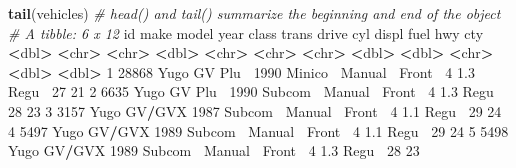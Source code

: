 \documentclass[
]{book}
\newenvironment{Shaded}{\begin{snugshade}}{\end{snugshade}}
\newcommand{\CommentTok}[1]{\textcolor[rgb]{0.56,0.35,0.01}{\textit{#1}}}
\newcommand{\DecValTok}[1]{\textcolor[rgb]{0.00,0.00,0.81}{#1}}
\newcommand{\ErrorTok}[1]{\textcolor[rgb]{0.64,0.00,0.00}{\textbf{#1}}}
\newcommand{\FloatTok}[1]{\textcolor[rgb]{0.00,0.00,0.81}{#1}}
\newcommand{\KeywordTok}[1]{\textcolor[rgb]{0.13,0.29,0.53}{\textbf{#1}}}
\newcommand{\NormalTok}[1]{#1}
\newcommand{\OperatorTok}[1]{\textcolor[rgb]{0.81,0.36,0.00}{\textbf{#1}}}
\newcommand{\StringTok}[1]{\textcolor[rgb]{0.31,0.60,0.02}{#1}}
\begin{document}
\begin{Shaded}
\begin{Highlighting}[]
\KeywordTok{tail}\NormalTok{(vehicles) }\CommentTok{# head() and tail() summarize the beginning and end of the object}
\CommentTok{# A tibble: 6 x 12}
\NormalTok{     id make  model    year class   trans   drive    cyl displ fuel    hwy   cty}
  \OperatorTok{<}\NormalTok{dbl}\OperatorTok{>}\StringTok{ }\ErrorTok{<}\NormalTok{chr}\OperatorTok{>}\StringTok{ }\ErrorTok{<}\NormalTok{chr}\OperatorTok{>}\StringTok{   }\ErrorTok{<}\NormalTok{dbl}\OperatorTok{>}\StringTok{ }\ErrorTok{<}\NormalTok{chr}\OperatorTok{>}\StringTok{   }\ErrorTok{<}\NormalTok{chr}\OperatorTok{>}\StringTok{   }\ErrorTok{<}\NormalTok{chr}\OperatorTok{>}\StringTok{  }\ErrorTok{<}\NormalTok{dbl}\OperatorTok{>}\StringTok{ }\ErrorTok{<}\NormalTok{dbl}\OperatorTok{>}\StringTok{ }\ErrorTok{<}\NormalTok{chr}\OperatorTok{>}\StringTok{ }\ErrorTok{<}\NormalTok{dbl}\OperatorTok{>}\StringTok{ }\ErrorTok{<}\NormalTok{dbl}\OperatorTok{>}
\DecValTok{1} \DecValTok{28868}\NormalTok{ Yugo  GV Plu}\OperatorTok{~}\StringTok{  }\DecValTok{1990}\NormalTok{ Minico}\OperatorTok{~}\StringTok{ }\NormalTok{Manual}\OperatorTok{~}\StringTok{ }\NormalTok{Front}\OperatorTok{~}\StringTok{     }\DecValTok{4}   \FloatTok{1.3}\NormalTok{ Regu}\OperatorTok{~}\StringTok{    }\DecValTok{27}    \DecValTok{21}
\DecValTok{2}  \DecValTok{6635}\NormalTok{ Yugo  GV Plu}\OperatorTok{~}\StringTok{  }\DecValTok{1990}\NormalTok{ Subcom}\OperatorTok{~}\StringTok{ }\NormalTok{Manual}\OperatorTok{~}\StringTok{ }\NormalTok{Front}\OperatorTok{~}\StringTok{     }\DecValTok{4}   \FloatTok{1.3}\NormalTok{ Regu}\OperatorTok{~}\StringTok{    }\DecValTok{28}    \DecValTok{23}
\DecValTok{3}  \DecValTok{3157}\NormalTok{ Yugo  GV}\OperatorTok{/}\NormalTok{GVX   }\DecValTok{1987}\NormalTok{ Subcom}\OperatorTok{~}\StringTok{ }\NormalTok{Manual}\OperatorTok{~}\StringTok{ }\NormalTok{Front}\OperatorTok{~}\StringTok{     }\DecValTok{4}   \FloatTok{1.1}\NormalTok{ Regu}\OperatorTok{~}\StringTok{    }\DecValTok{29}    \DecValTok{24}
\DecValTok{4}  \DecValTok{5497}\NormalTok{ Yugo  GV}\OperatorTok{/}\NormalTok{GVX   }\DecValTok{1989}\NormalTok{ Subcom}\OperatorTok{~}\StringTok{ }\NormalTok{Manual}\OperatorTok{~}\StringTok{ }\NormalTok{Front}\OperatorTok{~}\StringTok{     }\DecValTok{4}   \FloatTok{1.1}\NormalTok{ Regu}\OperatorTok{~}\StringTok{    }\DecValTok{29}    \DecValTok{24}
\DecValTok{5}  \DecValTok{5498}\NormalTok{ Yugo  GV}\OperatorTok{/}\NormalTok{GVX   }\DecValTok{1989}\NormalTok{ Subcom}\OperatorTok{~}\StringTok{ }\NormalTok{Manual}\OperatorTok{~}\StringTok{ }\NormalTok{Front}\OperatorTok{~}\StringTok{     }\DecValTok{4}   \FloatTok{1.3}\NormalTok{ Regu}\OperatorTok{~}\StringTok{    }\DecValTok{28}    \DecValTok{23}

\end{Highlighting}
\end{Shaded}
\end{document}
